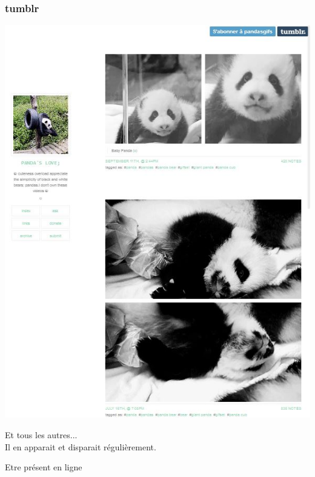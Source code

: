 \documentclass{beamer}
\begin{document}
\begin{frame}
\frametitle{tumblr}
\begin{center}
\includegraphics[scale=0.4] {./images/tumblr.jpg} 
\end{center}
\end{frame}

\begin{frame}
\begin{center}
\Huge{Et tous les autres... \\Il en apparait et disparait régulièrement.}
\end{center}
\end{frame}

\begin{frame}
\begin{center}
\Huge{Etre présent en ligne}
\end{center}
\end{frame}
\end{document}
